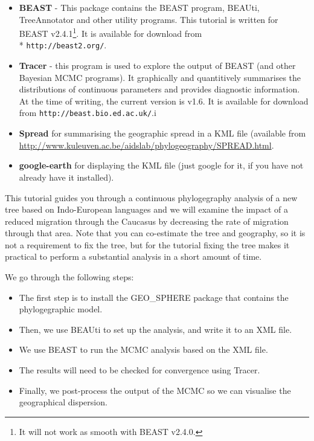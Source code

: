 \documentclass{article}
\newcommand{\BEASTVersion}{2.4.1}
\newcommand{\TracerVersion}{1.6}
\def\beast-geo{GEO\_SPHERE}
\begin{document}
\begin{itemize}

\item {\bf BEAST} - This package contains the BEAST program, BEAUti, TreeAnnotator and other utility programs. This tutorial is written for BEAST v{\BEASTVersion}\footnote{It will not work as smooth with BEAST v2.4.0.}. It is available for download from \\* \texttt{http://beast2.org/}.
\item {\bf Tracer} - this program is used to explore the output of BEAST (and other Bayesian MCMC programs). It graphically and
quantitively summarises the distributions of continuous parameters and provides diagnostic information. At the time of
writing, the current version is v{\TracerVersion}. It is available for download from \texttt{http://beast.bio.ed.ac.uk/}.i
\item {\bf Spread} for summarising the geographic spread in a KML file (available from \url{http://www.kuleuven.ac.be/aidslab/phylogeography/SPREAD.html}.
\item {\bf google-earth} for displaying the KML file (just google for it, if you have not already have it installed).
\end{itemize}


This tutorial guides you through a continuous phylogegraphy analysis of a new tree based on Indo-European languages and we will examine the impact of a reduced migration through the Caucasus by decreasing the rate of migration through that area. Note that you can co-estimate the tree and geography, so it is not a requirement to fix the tree, but for the tutorial fixing the tree makes it practical to perform a substantial analysis in a short amount of time.

We go through the following steps:
\begin{itemize}
\item The first step is to install the \beast-geo{} package that contains the phylogegraphic model. 
\item Then, we use BEAUti to set up the analysis, and write it to an XML file.
\item We use BEAST to run the MCMC analysis based on the XML file.
\item The results will need to be checked for convergence using Tracer.
\item Finally, we post-process the output of the MCMC so we can visualise the geographical dispersion.
\end{itemize}
\end{document}
